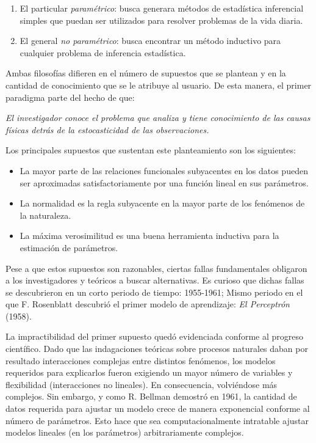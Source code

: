 \documentclass{book}
\theoremstyle{plain}
\theoremstyle{definition}
\theoremstyle{remark}
\begin{document}
\begin{enumerate}
\item El particular \emph{paramétrico}: busca generara métodos de estadística inferencial  simples que puedan ser utilizados para resolver problemas de la vida diaria.
\item El general \emph{no paramétrico}: busca encontrar un método inductivo para cualquier problema de inferencia estadística.
\end{enumerate}

Ambas filosofías difieren en el número de supuestos que se plantean y en la cantidad de conocimiento que se le atribuye al usuario. De esta manera, el primer paradigma parte del hecho de que:

\begin{changemargin}{1.5cm}{1.5cm}
\emph{El investigador conoce el problema que analiza y tiene conocimiento de las causas físicas detrás de la estocasticidad de las observaciones.}
\end{changemargin}

Los principales supuestos que sustentan este planteamiento son los siguientes:

\begin{itemize}
\item La mayor parte de las relaciones funcionales subyacentes en los datos pueden ser aproximadas satisfactoriamente por una función lineal en sus parámetros.
\item La normalidad es la regla subyacente en la mayor parte de los fenómenos de la naturaleza.
\item La máxima verosimilitud es una buena herramienta inductiva para la estimación de parámetros.
\end{itemize}

Pese a que estos supuestos son razonables, ciertas fallas fundamentales obligaron a los investigadores y teóricos a buscar alternativas. Es curioso que dichas fallas se descubrieron en un corto periodo de tiempo: 1955-1961; Mismo periodo en el que F. Rosenblatt descubrió el primer modelo de aprendizaje: \emph{El Perceptrón} (1958).

La impractibilidad del primer supuesto quedó evidenciada conforme al progreso científico. Dado que las indagaciones teóricas sobre procesos naturales daban por resultado interacciones complejas entre distintos fenómenos, los modelos requeridos para explicarlos fueron exigiendo un mayor número  de variables y flexibilidad (interacciones no lineales). En consecuencia, volviéndose más complejos. Sin embargo, y como R. Bellman demostró en 1961, la cantidad de datos requerida para ajustar un modelo crece de manera exponencial conforme al número de parámetros. Esto hace que sea computacionalmente intratable ajustar modelos lineales (en los parámetros) arbitrariamente complejos. 
\end{document}
